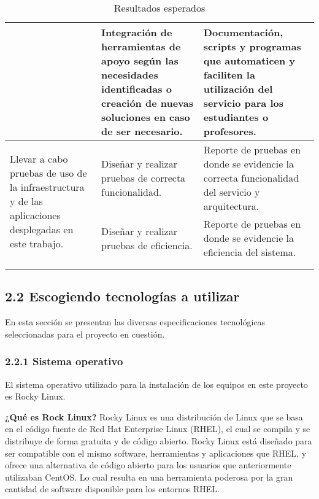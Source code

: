 \begin{doublespace}
\begin{longtable}{m{4.6cm}m{4.6cm}m{4.6cm}}
    \\ \cline{2-3}
                                                                         &
    Integración de herramientas de apoyo según las necesidades identificadas o creación de nuevas soluciones en caso de ser necesario.            &
    Documentación, scripts y programas que automaticen y faciliten la utilización del servicio para los estudiantes o profesores.                                                               \\
    \hline
    \multirow{2}{4.3cm}{Llevar a cabo pruebas de uso de la infraestructura y de las aplicaciones desplegadas en este trabajo.}            &
    Diseñar y realizar pruebas de correcta funcionalidad.                                                         &
    Reporte de pruebas en donde se evidencie la correcta funcionalidad del servicio y arquitectura.
    \\ \cline{2-3}
                                                                         &
    Diseñar y realizar pruebas de eficiencia.            &
    Reporte de pruebas en donde se evidencie la eficiencia del sistema.                                                          \\
    \hline
    \\ 
    \caption{Resultados esperados}
    \label{table:table4}
    \end{longtable}

\begin{multicols}{2}

    \subsection{2.2 Escogiendo tecnologías a utilizar}
    En esta sección se presentan las diversas especificaciones tecnológicas seleccionadas para el proyecto en cuestión.

    \subsubsection{2.2.1 Sistema operativo}
    El sistema operativo utilizado para la instalación de los equipos en este proyecto es Rocky Linux.

    \textbf{¿Qué es Rock Linux?}
    \newline
    Rocky Linux es una distribución de Linux que se basa en el código fuente de Red Hat Enterprise Linux (RHEL), el cual se compila y se distribuye de forma gratuita y de código abierto. Rocky Linux está diseñado para ser compatible con el mismo software, herramientas y aplicaciones que RHEL, y ofrece una alternativa de código abierto para los usuarios que anteriormente utilizaban CentOS. Lo cual resulta en una herramienta poderosa por la gran cantidad de software disponible para los entornos RHEL.


\end{multicols}
\end{doublespace}
